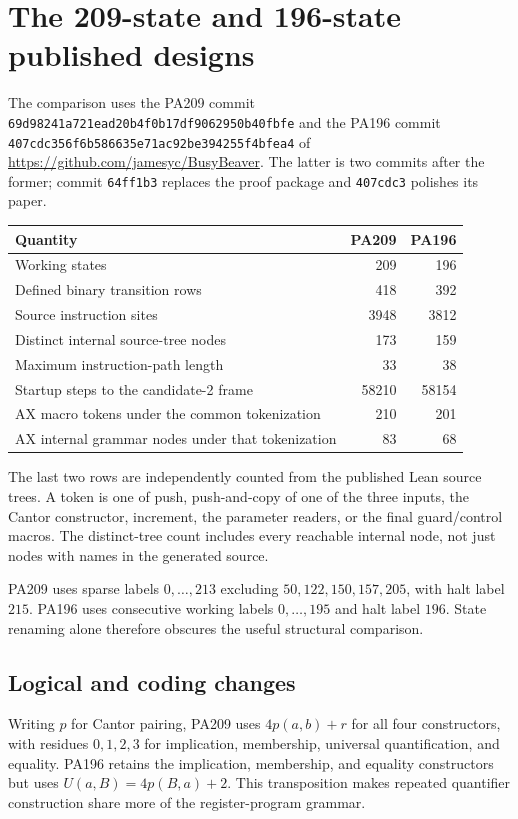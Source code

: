\section{The 209-state and 196-state published designs}

The comparison uses the PA209 commit
\texttt{69d98241a721ead20b4f0b17df9062950b40fbfe} and the PA196 commit
\texttt{407cdc356f6b586635e71ac92be394255f4bfea4} of
\url{https://github.com/jamesyc/BusyBeaver}. The latter is two commits after
the former; commit \texttt{64ff1b3} replaces the proof package and
\texttt{407cdc3} polishes its paper.

\begin{center}
\begin{tabular}{lrr}
\hline
Quantity & PA209 & PA196\\\hline
Working states &209&196\\
Defined binary transition rows&418&392\\
Source instruction sites&3948&3812\\
Distinct internal source-tree nodes&173&159\\
Maximum instruction-path length&33&38\\
Startup steps to the candidate-2 frame&58210&58154\\
AX macro tokens under the common tokenization&210&201\\
AX internal grammar nodes under that tokenization&83&68\\\hline
\end{tabular}
\end{center}
The last two rows are independently counted from the published Lean source
trees. A token is one of push, push-and-copy of one of the three inputs,
the Cantor constructor, increment, the parameter readers, or the final
guard/control macros. The distinct-tree count includes every reachable
internal node, not just nodes with names in the generated source.

PA209 uses sparse labels $0,\ldots,213$ excluding
$50,122,150,157,205$, with halt label $215$. PA196 uses consecutive
working labels $0,\ldots,195$ and halt label $196$. State renaming alone
therefore obscures the useful structural comparison.

\subsection{Logical and coding changes}

Writing $p$ for Cantor pairing, PA209 uses $4p(a,b)+r$ for all four
constructors, with residues $0,1,2,3$ for implication, membership,
universal quantification, and equality. PA196 retains the implication,
membership, and equality constructors but uses
$U(a,B)=4p(B,a)+2$. This transposition makes repeated quantifier
construction share more of the register-program grammar.

